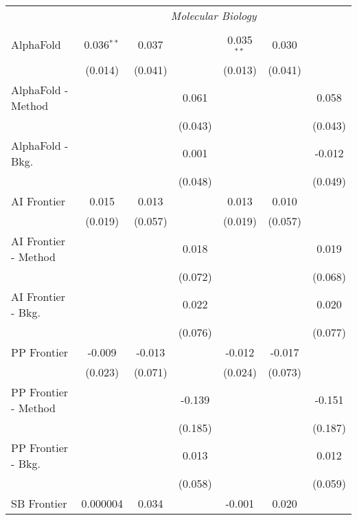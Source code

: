 \begin{tabular}{lcccccc}
 & \multicolumn{6}{c}{\textit{Molecular Biology}} \\ \\
   AlphaFold            & 0.036$^{**}$ & 0.037   &         & 0.035$^{**}$ & 0.030   &   \\   
                        & (0.014)      & (0.041) &         & (0.013)      & (0.041) &   \\   
   AlphaFold - Method   &              &         & 0.061   &              &         & 0.058\\   
                        &              &         & (0.043) &              &         & (0.043)\\   
   AlphaFold - Bkg.     &              &         & 0.001   &              &         & -0.012\\   
                        &              &         & (0.048) &              &         & (0.049)\\   
   AI Frontier          & 0.015        & 0.013   &         & 0.013        & 0.010   &   \\   
                        & (0.019)      & (0.057) &         & (0.019)      & (0.057) &   \\   
   AI Frontier - Method &              &         & 0.018   &              &         & 0.019\\   
                        &              &         & (0.072) &              &         & (0.068)\\   
   AI Frontier - Bkg.   &              &         & 0.022   &              &         & 0.020\\   
                        &              &         & (0.076) &              &         & (0.077)\\   
   PP Frontier          & -0.009       & -0.013  &         & -0.012       & -0.017  &   \\   
                        & (0.023)      & (0.071) &         & (0.024)      & (0.073) &   \\   
   PP Frontier - Method &              &         & -0.139  &              &         & -0.151\\   
                        &              &         & (0.185) &              &         & (0.187)\\   
   PP Frontier - Bkg.   &              &         & 0.013   &              &         & 0.012\\   
                        &              &         & (0.058) &              &         & (0.059)\\   
   SB Frontier          & 0.000004     & 0.034   &         & -0.001       & 0.020   &   \\   

\end{tabular}
